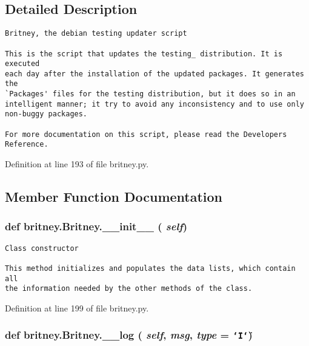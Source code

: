 \subsection{Detailed Description}


\footnotesize\begin{verbatim}Britney, the debian testing updater script

This is the script that updates the testing_ distribution. It is executed
each day after the installation of the updated packages. It generates the 
`Packages' files for the testing distribution, but it does so in an
intelligent manner; it try to avoid any inconsistency and to use only
non-buggy packages.

For more documentation on this script, please read the Developers Reference.
\end{verbatim}
\normalsize
 



Definition at line 193 of file britney.py.

\subsection{Member Function Documentation}
\subsubsection{\setlength{\rightskip}{0pt plus 5cm}def britney.Britney.\_\-\_\-init\_\-\_\- ( {\em self})}\label{classbritney_1_1Britney_5846d81eace24f479292c47e30fd1851}




\footnotesize\begin{verbatim}Class constructor

This method initializes and populates the data lists, which contain all
the information needed by the other methods of the class.
\end{verbatim}
\normalsize
 

Definition at line 199 of file britney.py.
\subsubsection{\setlength{\rightskip}{0pt plus 5cm}def britney.Britney.\_\-\_\-log ( {\em self},  {\em msg},  {\em type} = {\tt \char`\"{}I\char`\"{}})}\label{classbritney_1_1Britney_678036a5200302d77249f5e702532681}




